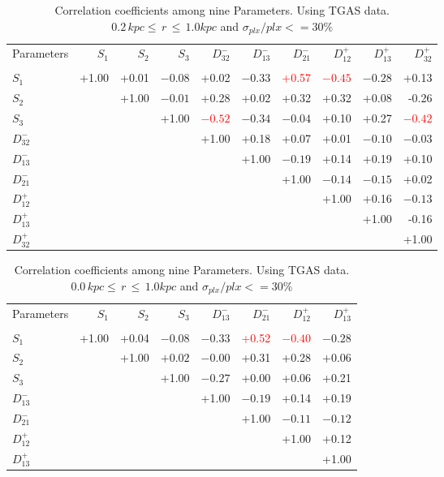 \documentclass[onecolumn]{aa}   %
\newcommand{\hlgt}    {\textcolor{red}}
\begin{document}
 \begin{table}
\caption{Correlation coefficients among nine Parameters. Using TGAS data. $0.2\,kpc \le \,r \, \le \,1.0kpc$  and $\sigma_{plx}/plx<=30\%$ }
\label{tab: 9Par_coeff1}
\begin{tabular}{l r r r r r r r  r r}
\hline
Parameters 	&$S_1$ 	&$S_2$  	&$S_3$	&$D^-_{32}$	&$D^-_{13}$	&$D^-_{21}$	&$D^+_{12}$	&$D^+_{13}$	&$D^+_{32}$ \\
\\
\hline

$S_1$		&+1.00	&+0.01 	&$-0.08$  	&+0.02 	&$- 0.33$	&\hlgt{+0.57}	&\hlgt{$ -0.45$}		
&$-0.28$	&+0.13 \\
$S_2$		&		&+1.00	&$-0.01$	&+0.28	&+0.02	&+0.32	&+0.32	&+0.08	
& -0.26 \\
$S_3$		&		&		&+1.00	&\hlgt{$-0.52$}	&$-0.34$	&$-0.04$	&+0.10	&+0.27	
&\hlgt{$-0.42$} \\
$D^-_{32}$	&		&		&		&+1.00	&+0.18	&+0.07	&+0.01	&$-0.10$	
&$-0.03$ \\
$D^-_{13}$	&		&		&		&		&+1.00	&$-0.19$	&+0.14	&+0.19
&+0.10 \\
$D^-_{21}$	&		&		&		&		&		&+1.00	&$-0.14$	&$-0.15$
&+0.02 \\
$D^+_{12}$	&		&		&		&		&		&		&+1.00	&+0.16
&$-0.13$ \\
$D^+_{13}$	&		&		&		&		&		&		&		&+1.00
& -0.16 \\	
$D^+_{32}$	&		&		&		&		&		&		&		&
&+1.00 \\

\hline
\end{tabular}
 \end{table}

 
 \begin{table}
\caption{Correlation coefficients among nine Parameters. Using TGAS data. $0.0\,kpc \le \,r \, \le \,1.0kpc$  and $\sigma_{plx}/plx<=30\%$ }
\label{tab: OM_coeff3}
\begin{tabular}{l r r r r r r r  }
\hline\hline
Parameters 	&$S_1$ 	&$S_2$  	&$S_3$	&$D^-_{13}$	&$D^-_{21}$	&$D^+_{12}$	&$D^+_{13}$	 \\
\\
\hline [0.5ex]

$S_1$		&+1.00	&+0.04 	&$-0.08$	&$- 0.33$		&\hlgt{+0.52}	&\hlgt{$ -0.40$}		&$-0.28$	 \\
$S_2$		&		&+1.00	&$+0.02$	&$- 0.00$		&+0.31		&+0.28			&+0.06	 \\
$S_3$		&		&		&+1.00	&$-0.27$		&+0.00		&+0.06			&+0.21	 \\
$D^-_{13}$	&		&		&		&+1.00		&$-0.19$		&+0.14			&+0.19 \\
$D^-_{21}$	&		&		&		&			&+1.00		&$-0.11$			&$-0.12$ \\
$D^+_{12}$	&		&		&		&			&			&+1.00			&+0.12  \\
$D^+_{13}$	&		&		&		&			&			&				&+1.00 \\	

\hline
\end{tabular}
 \end{table}
 
\end{document}
